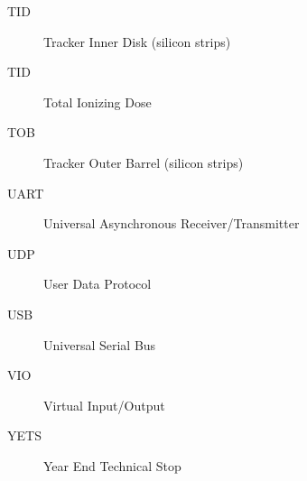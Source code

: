 \begin{description}
    \item[TID]          \dotfill  Tracker Inner Disk (silicon strips)
    \item[TID]          \dotfill  Total Ionizing Dose
    \item[TOB]          \dotfill  Tracker Outer Barrel (silicon strips)
    \item[UART]          \dotfill  Universal Asynchronous Receiver/Transmitter
    \item[UDP]          \dotfill  User Data Protocol
    \item[USB]          \dotfill  Universal Serial Bus
    \item[VIO]          \dotfill  Virtual Input/Output
    \item[YETS]          \dotfill  Year End Technical Stop

  \end{description}
